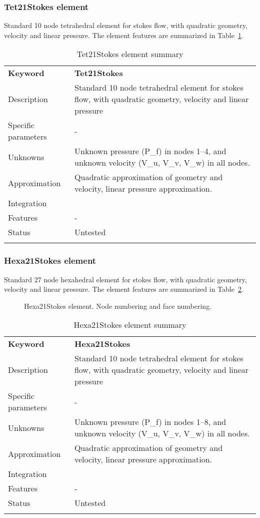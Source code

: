 \documentclass[a4paper]{article}
\newcommand{\param}[1]{\texttt{#1}} %
\newcommand{\templabel}{}%
\newcommand{\tempcaption}{}%
\newcounter{nelpar}
\newenvironment{elementsummary}[5]{%
  \gdef\tempcaption{#4}%
  \gdef\templabel{#5}%
  \setcounter{nelpar}{0}%
  \begin{center} %
    \begin{table}[!htb] %
      \begin{tabular}{|l|p{9cm}|}\hline %
        {\bf Keyword} & \bf{#1}\\ %
        {Description} & {#2}\\ %
        {Specific parameters} & {#3}\\ \hline %
}{
  \\ \hline %
      \end{tabular}%
      \caption{\tempcaption}%
      \label{\templabel}%
    \end{table}%
  \end{center}%
}
\newcommand{\elementParam}[1]{%
  \ifthenelse{\value{nelpar}>0} %
             {&{#1}}%
             {\setcounter{nelpar}{1}Parameters&{#1}}%
             \\%
}
\newcommand{\elementDescription}[2]{{#1} & {#2}\\ }
\begin{document}
\subsubsection{Tet21Stokes element}
Standard 10 node tetrahedral element for stokes flow, with quadratic geometry, velocity and linear pressure. The element features are summarized in Table~\ref{Tet21Stokessummary}.

\begin{elementsummary}{Tet21Stokes}{Standard 10 node tetrahedral element for stokes flow, with quadratic geometry, velocity and linear pressure}{-}{Tet21Stokes element summary}{Tet21Stokessummary}
\elementDescription{Unknowns}{Unknown pressure (P\_f) in nodes 1--4, and unknown velocity (V\_u, V\_v, V\_w) in all nodes.}
\elementDescription{Approximation}{Quadratic approximation of geometry and velocity, linear pressure approximation.}
\elementDescription{Integration}{}
\elementDescription{Features}{-}
\elementDescription{Status}{Untested}
\end{elementsummary}

\subsubsection{Hexa21Stokes element}
Standard 27 node hexahedral element for stokes flow, with quadratic geometry, velocity and linear pressure. The element features are summarized in Table~\ref{Hexa21Stokessummary}.

\begin{figure}[htb]
 \centering
 \begin{makeimage}
  \raisebox{-0.5\height}{}
  \raisebox{-0.5\height}{}
 \end{makeimage}
 \caption{Hexa21Stokes element. Node numbering and face numbering.}
 \label{Hexa21Stokes}
\end{figure}

\begin{elementsummary}{Hexa21Stokes}{Standard 10 node tetrahedral element for stokes flow, with quadratic geometry, velocity and linear pressure}{-}{Hexa21Stokes element summary}{Hexa21Stokessummary}
\elementDescription{Unknowns}{Unknown pressure (P\_f) in nodes 1--8, and unknown velocity (V\_u, V\_v, V\_w) in all nodes.}
\elementDescription{Approximation}{Quadratic approximation of geometry and velocity, linear pressure approximation.}
\elementDescription{Integration}{}
\elementDescription{Features}{-}
\elementDescription{Status}{Untested}
\end{elementsummary}
\end{document}
